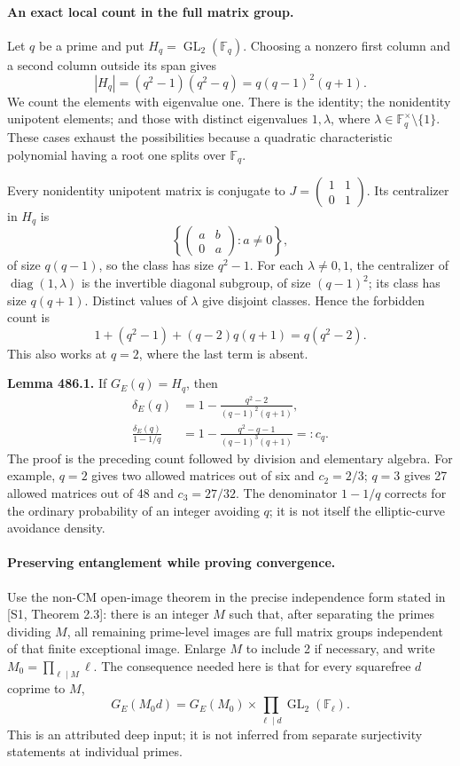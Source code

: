 \documentclass[11pt]{article}
\begin{document}
\paragraph{An exact local count in the full matrix group.}
Let $q$ be a prime and put $H_q=\operatorname{GL}_2(\mathbb F_q)$.
Choosing a nonzero first column and a second column outside its span gives
\[
 |H_q|=(q^2-1)(q^2-q)=q(q-1)^2(q+1).
\]
We count the elements with eigenvalue one. There is the identity; the
nonidentity unipotent elements; and those with distinct eigenvalues
$1,\lambda$, where $\lambda\in\mathbb F_q^\times\setminus\{1\}$.
These cases exhaust the possibilities because a quadratic characteristic
polynomial having a root one splits over $\mathbb F_q$.

Every nonidentity unipotent matrix is conjugate to
$J=\begin{pmatrix}1&1\\0&1\end{pmatrix}$. Its centralizer in $H_q$ is
\[
 \left\{\begin{pmatrix}a&b\\0&a\end{pmatrix}:a\ne0\right\},
\]
of size $q(q-1)$, so the class has size $q^2-1$. For each
$\lambda\ne0,1$, the centralizer of $\operatorname{diag}(1,\lambda)$
is the invertible diagonal subgroup, of size $(q-1)^2$; its class has
size $q(q+1)$. Distinct values of $\lambda$ give disjoint classes.
Hence the forbidden count is
\[
 1+(q^2-1)+(q-2)q(q+1)=q(q^2-2).
\]
This also works at $q=2$, where the last term is absent.

\textbf{Lemma 486.1.}
If $G_E(q)=H_q$, then
\begin{align}
 \delta_E(q)&=1-\frac{q^2-2}{(q-1)^2(q+1)},\label{ra486:local}\\
 \frac{\delta_E(q)}{1-1/q}
 &=1-\frac{q^2-q-1}{(q-1)^3(q+1)}=:c_q.\label{ra486:factor}
\end{align}
The proof is the preceding count followed by division and elementary
algebra. For example, $q=2$ gives two allowed matrices out of six and
$c_2=2/3$; $q=3$ gives 27 allowed matrices out of 48 and $c_3=27/32$.
The denominator $1-1/q$ corrects for the ordinary probability of an integer
avoiding $q$; it is not itself the elliptic-curve avoidance density.

\paragraph{Preserving entanglement while proving convergence.}
Use the non-CM open-image theorem in the precise independence form stated
in [S1, Theorem 2.3]: there is an integer $M$ such that, after separating
the primes dividing $M$, all remaining prime-level images are full matrix
groups independent of that finite exceptional image. Enlarge $M$ to include
2 if necessary, and write $M_0=\prod_{\ell\mid M}\ell$. The consequence
needed here is that for every squarefree $d$ coprime to $M$,
\begin{equation}\label{ra486:split}
 G_E(M_0d)=G_E(M_0)\times\prod_{\ell\mid d}\operatorname{GL}_2(\mathbb F_\ell).
\end{equation}
This is an attributed deep input; it is not inferred from separate
surjectivity statements at individual primes.
\end{document}
